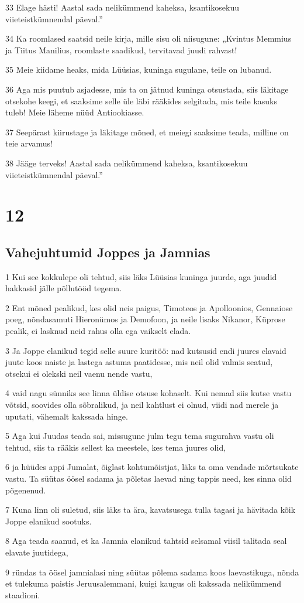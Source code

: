 \par 33 Elage hästi! Aastal sada nelikümmend kaheksa, ksantikosekuu viieteistkümnendal päeval.”
\par 34 Ka roomlased saatsid neile kirja, mille sisu oli niisugune: „Kvintus Memmius ja Tiitus Manilius, roomlaste saadikud, tervitavad juudi rahvast!
\par 35 Meie kiidame heaks, mida Lüüsias, kuninga sugulane, teile on lubanud.
\par 36 Aga mis puutub asjadesse, mis ta on jätnud kuninga otsustada, siis läkitage otsekohe keegi, et saaksime selle üle läbi rääkides selgitada, mis teile kasuks tuleb! Meie läheme nüüd Antiookiasse.
\par 37 Seepärast kiirustage ja läkitage mõned, et meiegi saaksime teada, milline on teie arvamus!
\par 38 Jääge terveks! Aastal sada nelikümmend kaheksa, ksantikosekuu viieteistkümnendal päeval.”



\chapter{12}


\section*{Vahejuhtumid Joppes ja Jamnias}

\par 1 Kui see kokkulepe oli tehtud, siis läks Lüüsias kuninga juurde, aga juudid hakkasid jälle põllutööd tegema.
\par 2 Ent mõned pealikud, kes olid neis paigus, Timoteos ja Apolloonios, Gennaiose poeg, nõndasamuti Hieronümos ja Demofoon, ja neile lisaks Nikanor, Küprose pealik, ei lasknud neid rahus olla ega vaikselt elada.
\par 3 Ja Joppe elanikud tegid selle suure kuritöö: nad kutsusid endi juures elavaid juute koos naiste ja lastega astuma paatidesse, mis neil olid valmis seatud, otsekui ei olekski neil vaenu nende vastu,
\par 4 vaid nagu sünniks see linna üldise otsuse kohaselt. Kui nemad siis kutse vastu võtsid, soovides olla sõbralikud, ja neil kahtlust ei olnud, viidi nad merele ja uputati, vähemalt kakssada hinge.
\par 5 Aga kui Juudas teada sai, missugune julm tegu tema sugurahva vastu oli tehtud, siis ta rääkis sellest ka meestele, kes tema juures olid,
\par 6 ja hüüdes appi Jumalat, õiglast kohtumõistjat, läks ta oma vendade mõrtsukate vastu. Ta süütas öösel sadama ja põletas laevad ning tappis need, kes sinna olid põgenenud.
\par 7 Kuna linn oli suletud, siis läks ta ära, kavatsusega tulla tagasi ja hävitada kõik Joppe elanikud sootuks.
\par 8 Aga teada saanud, et ka Jamnia elanikud tahtsid selsamal viisil talitada seal elavate juutidega,
\par 9 ründas ta öösel jamnialasi ning süütas põlema sadama koos laevastikuga, nõnda et tulekuma paistis Jeruusalemmani, kuigi kaugus oli kakssada nelikümmend staadioni.


